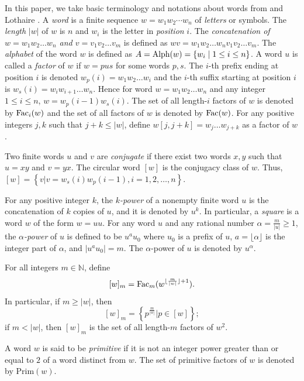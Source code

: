 \documentclass[runningheads,envcountsame,a4paper]{llncs}
\newcommand{\Alphabet}{\hbox{\rm Alph}}
\newcommand{\fac}{\hbox{\rm Fac}}
\newcommand{\pri}{\mathrm{Prim}}
\newcommand{\NN}{\mathbb{N}}
\begin{document}
In this paper, we take basic terminology and notations about words from \cite{sum} and Lothaire \cite{lothaire3}. A {\em word} is a finite sequence   $w = w_1 w_2 \cdots w_{n}$ of \emph{letters} or symbols. The {\em length} $|w|$ of $w$ is $n$ and $w_i$ is the letter in  {\em position} $i$. The {\em concatenation of $w= w_1 w_2 \ldots w_{n}$ and $v= v_1 v_2 \ldots v_{m}$} is defined as 
$wv=w_1 w_2 \ldots w_{n}v_1 v_2 \ldots v_{m}$. The {\em alphabet} of the word $w$ is defined as $A= \Alphabet(w)=\left\{w_i \mid 1\leq i \leq n\right\}$. A word $u$ is called a {\em factor} of $w$ if $w = pus$ for some words $p,s$. The $i$-th prefix ending at position $i$ is denoted $w_p(i) =w_1w_2 \ldots w_{i}$ and the  $i$-th suffix starting at position $i$ is  
$w_{s}(i)=w_iw_{i+1} \ldots w_{n}$. Hence for word $w=w_1w_2 \ldots w_n$ and any integer $1 \leq i \leq n$, $w= w_p(i-1) w_{s}(i)$. The set of all length-$i$ factors of $w$ is denoted by $\fac_i(w)$ and the set of all factors of $w$ is denoted by $\fac(w)$. For any positive integers $j,k$ such that $j+k\le |w|$, define $w[j,j+k]=w_{j}\ldots w_{j+k}$ as a factor of $w$. 


Two finite words $u$ and $v$ are {\em conjugate} if there exist two words $x,y$ such that $u=xy$ and $v=yx$.
The circular word $[w]$ is the conjugacy class of $w$. Thus, $[w]=\left\{v|v=w_s(i)w_p(i-1), i=1,2,\ldots, n\right\}$.

For any positive integer $k$,  the {\em $k$-power} of a nonempty finite word $u$ is the concatenation of $k$ copies of $u$, and it is denoted by $u^k$. In particular, a \emph{square} is a word $w$ of the form $w=uu$. For any word $u$ and any rational number $\alpha=\frac{m}{|u|} \geq 1$, the \emph{$\alpha$-power} of $u$ is defined to be $u^au_0$ where $u_0$ is a prefix of $u$, $a=\lfloor \alpha \rfloor$ is the integer part of $\alpha$, and $|u^au_0|=m$. The $\alpha$-power of $u$ is denoted by $u^{\alpha}$. 

For all integers $m\in\NN$, define 
$$[w]_m=\fac_m(w^{\lfloor \frac{m}{|w|} \rfloor+1}).$$
In particular, if $m \geq |w|$, then
$$[w]_m=\left\{p^{\frac{m}{|w|}}| p \in [w]\right\};$$
if $m < |w|$, then $[w]_m$ is the set of all length-$m$ factors of $w^2$. 

A word $w$ is said to be {\em primitive} if it is not an integer power greater than or equal to $2$ of a word distinct from $w$. The set of primitive factors of $w$ is denoted by $\pri(w)$.  
\end{document}
